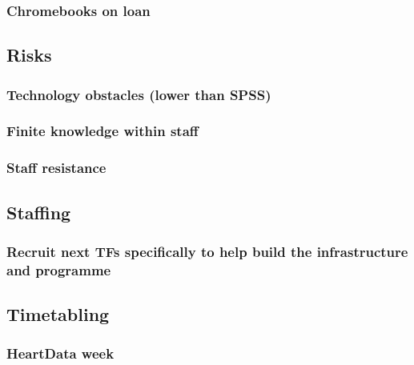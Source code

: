 \documentclass[
  11pt,
  letterpaper,
  oneside,
  open=any]{scrbook}
\begin{document}
\hypertarget{chromebooks-on-loan}{%
\subsubsection{Chromebooks on loan}\label{chromebooks-on-loan}}

\hypertarget{risks}{%
\subsection{Risks}\label{risks}}

\hypertarget{technology-obstacles-lower-than-spss}{%
\subsubsection{Technology obstacles (lower than
SPSS)}\label{technology-obstacles-lower-than-spss}}

\hypertarget{finite-knowledge-within-staff}{%
\subsubsection{Finite knowledge within
staff}\label{finite-knowledge-within-staff}}

\hypertarget{staff-resistance}{%
\subsubsection{Staff resistance}\label{staff-resistance}}

\hypertarget{staffing}{%
\subsection{Staffing}\label{staffing}}

\hypertarget{recruit-next-tfs-specifically-to-help-build-the-infrastructure-and-programme}{%
\subsubsection{Recruit next TFs specifically to help build the
infrastructure and
programme}\label{recruit-next-tfs-specifically-to-help-build-the-infrastructure-and-programme}}

\hypertarget{timetabling}{%
\subsection{Timetabling}\label{timetabling}}

\hypertarget{heartdata-week}{%
\subsubsection{HeartData week}\label{heartdata-week}}
\end{document}
